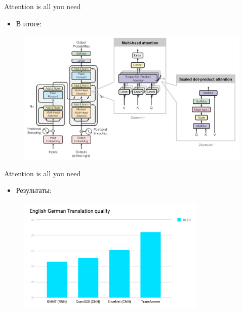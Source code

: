 \begin{frame}[c]{Attention is all you need}
\begin{itemize}
	[square]
	\item В итоге:
\end{itemize}
	\begin{figure}
		\centering
		\includegraphics[width=1.0\textwidth]{figures/transformer_full.png}
	\end{figure}

\end{frame}


\begin{frame}[c]{Attention is all you need}
\begin{itemize}
	[square]
	\item Результаты:
\end{itemize}
\begin{figure}
	\centering
	\includegraphics[width=0.8\textwidth]{figures/transformer_res.png}
\end{figure}
\end{frame}

